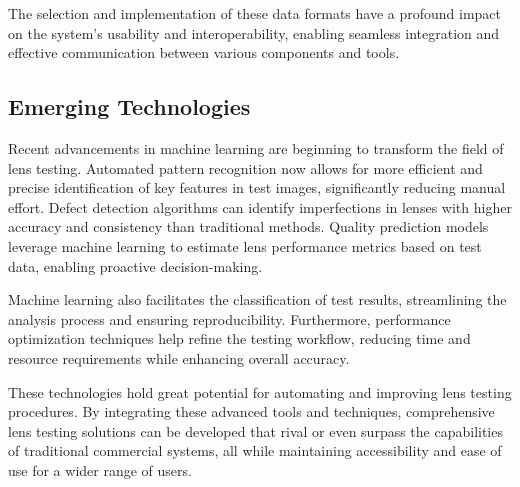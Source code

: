 The selection and implementation of these data formats have a profound impact on the system's usability and interoperability, enabling seamless integration and effective communication between various components and tools.

\subsection{Emerging Technologies}

Recent advancements in machine learning are beginning to transform the field of lens testing. Automated pattern recognition now allows for more efficient and precise identification of key features in test images, significantly reducing manual effort. Defect detection algorithms can identify imperfections in lenses with higher accuracy and consistency than traditional methods. Quality prediction models leverage machine learning to estimate lens performance metrics based on test data, enabling proactive decision-making.

Machine learning also facilitates the classification of test results, streamlining the analysis process and ensuring reproducibility. Furthermore, performance optimization techniques help refine the testing workflow, reducing time and resource requirements while enhancing overall accuracy.

These technologies hold great potential for automating and improving lens testing procedures. By integrating these advanced tools and techniques, comprehensive lens testing solutions can be developed that rival or even surpass the capabilities of traditional commercial systems, all while maintaining accessibility and ease of use for a wider range of users.
